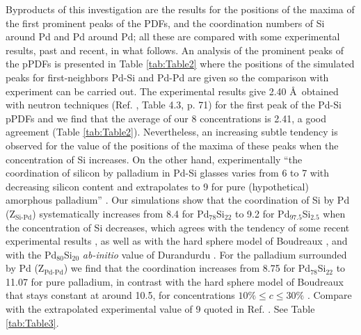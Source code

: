 \documentclass[fleqn,12pt]{wlscirep}
\begin{document}
Byproducts of this investigation are the results for the positions of the maxima of the first prominent peaks of the PDFs, and the coordination numbers of Si around Pd and Pd around Pd; all these are compared with some experimental results, past and recent, in what follows. An analysis of the prominent peaks of the pPDFs is presented in Table \ref{tab:Table2} where the positions of the simulated peaks for first-neighbors Pd-Si and Pd-Pd are given so the comparison with experiment can be carried out. The experimental results give 2.40 \AA\ obtained with neutron techniques (Ref. \cite{Wong_Guntherodt_book_1981}, Table 4.3, p. 71) for the first peak of the Pd-Si pPDFs and we find that the average of our 8 concentrations is 2.41, a good agreement (Table \ref{tab:Table2}). Nevertheless, an increasing subtle tendency is observed for the value of the positions of the maxima of these peaks when the concentration of Si increases. On the other hand, experimentally ``the coordination of silicon by palladium in Pd-Si glasses varies from 6 to 7 with decreasing silicon content and extrapolates to 9 for pure (hypothetical) amorphous palladium'' \cite{Wong_Guntherodt_book_1981}. Our simulations show that the coordination of Si by Pd (Z$_{\text{Si-Pd}}$) systematically increases from 8.4 for Pd$_{78}$Si$_{22}$ to 9.2 for Pd$_{97.5}$Si$_{2.5}$ when the concentration of Si decreases, which agrees with the tendency of some recent experimental results \cite{Ohkubo_2003, Nishi_1988}, as well as with the hard sphere model of Boudreaux \cite{Boudreaux_1978}, and with the Pd$_{80}$Si$_{20}$ \textit{ab-initio} value of Durandurdu \cite{Durandurdu_2012}. For the palladium surrounded by Pd (Z$_{\text{Pd-Pd}}$) we find that the coordination increases from 8.75 for Pd$_{78}$Si$_{22}$ to 11.07 for pure palladium, in contrast with the hard sphere model of Boudreaux that stays constant at around 10.5, for concentrations $10\% \leq c \leq 30\%$ \cite{Boudreaux_1978}. Compare with the extrapolated experimental value of 9 quoted in Ref. \cite{Wong_Guntherodt_book_1981}. See Table \ref{tab:Table3}.
\end{document}
